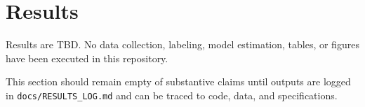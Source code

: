 \section{Results}\label{sec:results}

Results are TBD. No data collection, labeling, model estimation, tables, or figures have been executed in this repository.

This section should remain empty of substantive claims until outputs are logged in \texttt{docs/RESULTS\_LOG.md} and can be traced to code, data, and specifications.
